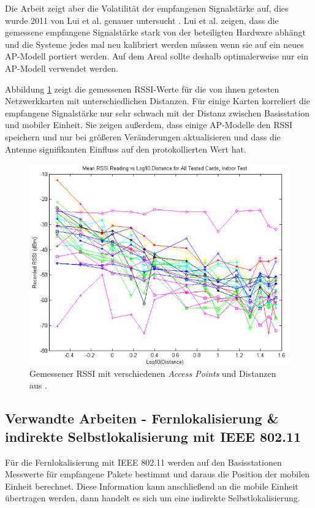Die Arbeit zeigt aber die Volatilität der empfangenen Signalstärke auf, dies wurde 2011 von Lui et al. genauer untersucht \cite{lui2011differences}.
Lui et al. zeigen, dass die gemessene empfangene Signalstärke stark von der beteiligten Hardware abhängt und die Systeme jedes mal neu kalibriert werden müssen wenn sie auf ein neues AP-Modell portiert werden. 
Auf dem Areal sollte deshalb optimalerweise nur ein AP-Modell verwendet werden. 

Abbildung \ref{fig:luiRSSI} zeigt die gemessenen RSSI-Werte für die von ihnen getesten Netzwerkkarten mit unterschiedlichen Distanzen. 
Für einige Karten korreliert die empfangene Signalstärke nur sehr schwach mit der Distanz zwischen Basisstation und mobiler Einheit.
Sie zeigen außerdem, dass einige AP-Modelle den RSSI speichern und nur bei größeren Veränderungen aktualisieren und dass die Antenne signifikanten Einfluss auf den protokollierten Wert hat.

\begin{figure}[h]
  \centering
	\includegraphics[width=\textwidth]{images/luiRSSI.png}
  \caption{Gemessener RSSI mit verschiedenen \emph{Access Points} und Distanzen aus \cite{lui2011differences}.}
  \label{fig:luiRSSI}
\end{figure}




\subsection{Verwandte Arbeiten - Fernlokalisierung \& indirekte Selbstlokalisierung mit IEEE 802.11}
Für die Fernlokalisierung mit IEEE 802.11 werden auf den Basisstationen Messwerte für empfangene Pakete bestimmt und daraus die Position der mobilen Einheit berechnet.
Diese Information kann anschließend an die mobile Einheit übertragen werden, dann handelt es sich um eine indirekte Selbstlokalisierung.


